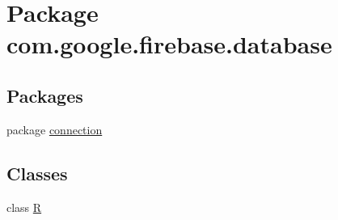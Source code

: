 \hypertarget{namespacecom_1_1google_1_1firebase_1_1database}{}\section{Package com.\+google.\+firebase.\+database}
\label{namespacecom_1_1google_1_1firebase_1_1database}
\subsection*{Packages}
\begin{DoxyCompactItemize}
\item 
package \mbox{\hyperlink{namespacecom_1_1google_1_1firebase_1_1database_1_1connection}{connection}}
\end{DoxyCompactItemize}
\subsection*{Classes}
\begin{DoxyCompactItemize}
\item 
class \mbox{\hyperlink{classcom_1_1google_1_1firebase_1_1database_1_1R}{R}}
\end{DoxyCompactItemize}
